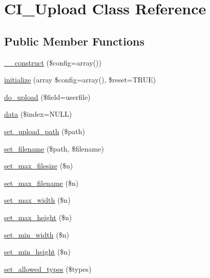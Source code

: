 \hypertarget{class_c_i___upload}{}\section{C\+I\+\_\+\+Upload Class Reference}
\label{class_c_i___upload}
\subsection*{Public Member Functions}
\begin{DoxyCompactItemize}
\item 
\mbox{\hyperlink{class_c_i___upload_af7f9493844d2d66e924e3c1df51ce616}{\+\_\+\+\_\+construct}} (\$config=array())
\item 
\mbox{\hyperlink{class_c_i___upload_a58cef448bae0c178f3f675700b7e4413}{initialize}} (array \$config=array(), \$reset=T\+R\+UE)
\item 
\mbox{\hyperlink{class_c_i___upload_a4cace770be6503a3563aae6cbb98086b}{do\+\_\+upload}} (\$field=\textquotesingle{}userfile\textquotesingle{})
\item 
\mbox{\hyperlink{class_c_i___upload_afe56c7645362202d2f1c7b8f7da67f39}{data}} (\$index=N\+U\+LL)
\item 
\mbox{\hyperlink{class_c_i___upload_ab2407f3a942d9b203f54e21194cf040d}{set\+\_\+upload\+\_\+path}} (\$path)
\item 
\mbox{\hyperlink{class_c_i___upload_a4b09b3f2b57a8bafcac1700f43d12c36}{set\+\_\+filename}} (\$path, \$filename)
\item 
\mbox{\hyperlink{class_c_i___upload_a1f78c3a54f32d313294b27cde4eafaf4}{set\+\_\+max\+\_\+filesize}} (\$n)
\item 
\mbox{\hyperlink{class_c_i___upload_aa288c7337b534788b32d66b23e25548e}{set\+\_\+max\+\_\+filename}} (\$n)
\item 
\mbox{\hyperlink{class_c_i___upload_a4028f187a825a666976cc3fe47cd44a8}{set\+\_\+max\+\_\+width}} (\$n)
\item 
\mbox{\hyperlink{class_c_i___upload_aaed82d431f5aeee6a0af294bc604a51e}{set\+\_\+max\+\_\+height}} (\$n)
\item 
\mbox{\hyperlink{class_c_i___upload_afe47751e024dc9bf07333060628e0fb4}{set\+\_\+min\+\_\+width}} (\$n)
\item 
\mbox{\hyperlink{class_c_i___upload_a72c6007605b27c92dfd83c6e21fe82e3}{set\+\_\+min\+\_\+height}} (\$n)
\item 
\mbox{\hyperlink{class_c_i___upload_a7c7ddfefedddc3fd625dd816d67c21bf}{set\+\_\+allowed\+\_\+types}} (\$types)

\end{DoxyCompactItemize}
